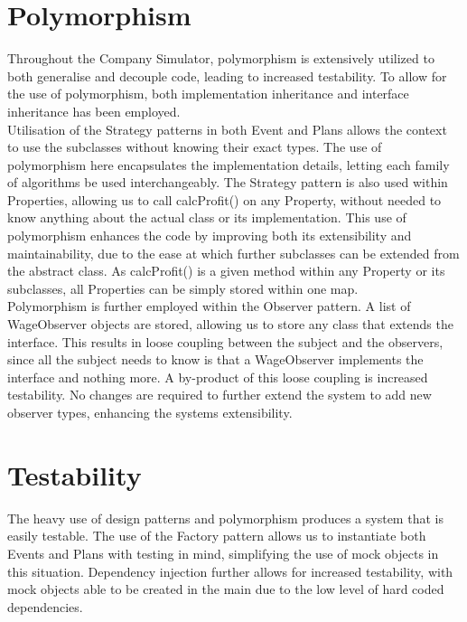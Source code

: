 \documentclass[]{article}
\begin{document}

\vspace*{0.8cm}
\section*{Polymorphism}

Throughout the Company Simulator, polymorphism is extensively utilized to both generalise and decouple code, leading to increased testability. To allow for the use of polymorphism, both implementation inheritance and interface inheritance has been employed. \\

Utilisation of the Strategy patterns in both Event and Plans allows the context to use the subclasses without knowing their exact types. The use of polymorphism here encapsulates the implementation details, letting each family of algorithms be used interchangeably. The Strategy pattern is also used within Properties, allowing us to call calcProfit() on any Property, without needed to know anything about the actual class or its implementation. This use of polymorphism enhances the code by improving both its extensibility and maintainability, due to the ease at which further subclasses can be extended from the abstract class. As calcProfit() is a given method within any Property or its subclasses, all Properties can be simply stored within one map.\\

Polymorphism is further employed within the Observer pattern. A list of WageObserver objects are stored, allowing us to store any class that extends the interface. This results in loose coupling between the subject and the observers, since all the subject needs to know is that a WageObserver implements the interface and nothing more. A by-product of this loose coupling is increased testability. No changes are required to further extend the system to add new observer types, enhancing the systems extensibility.


\section*{Testability}

The heavy use of design patterns and polymorphism produces a system that is easily testable. The use of the Factory pattern allows us to instantiate both Events and Plans with testing in mind, simplifying the use of mock objects in this situation. Dependency injection further allows for increased testability, with mock objects able to be created in the main due to the low level of hard coded dependencies.\\
\end{document}
